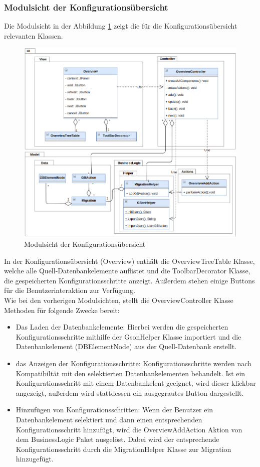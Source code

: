 \subsubsection{Modulsicht der Konfigurationsübersicht}
Die Modulsicht in der Abbildung \ref{img:modulsicht-overview} zeigt die für die Konfigurationsübersicht relevanten Klassen.
\begin{figure}[H]
	\centering
	\includegraphics[width=\textwidth]{images/sichten/modulsicht-overview}
	\caption{Modulsicht der Konfigurationsübersicht}
	\label{img:modulsicht-overview}
\end{figure}
In der Konfigurationsübersicht (Overview) enthält die OverviewTreeTable Klasse, welche alle Quell-Datenbankelemente auflistet und die ToolbarDecorator Klasse, die gespeicherten Konfigurationsschritte anzeigt. Außerdem stehen einige Buttons für die Benutzerinteraktion zur Verfügung. \\
Wie bei den vorherigen Modulsichten, stellt die OverviewController Klasse Methoden für folgende Zwecke bereit:
\begin{itemize}
	\item Das Laden der Datenbankelemente: Hierbei werden die gespeicherten Konfigurationsschritte mithilfe der GsonHelper Klasse importiert und die Datenbankelement (DBElementNode) aus der Quell-Datenbank erstellt.
	\item das Anzeigen der Konfigurationsschritte: Konfigurationsschritte werden nach Kompatibiltät mit den selektierten Datenbankelementen behandelt. Ist ein Konfigurationsschritt mit einem Datenbankelent geeignet, wird dieser klickbar angezeigt, außerdem wird stattdessen ein ausgegrautes Button dargestellt.
	\item Hinzufügen von Konfigurationsschritten: Wenn der Benutzer ein Datenbankelement selektiert und dann einen entsprechenden Konfigurationsschritt hinzufügt, wird die OverviewAddAction Aktion von dem BusinessLogic Paket ausgelöst. Dabei wird der entsprechende Konfigurationsschritt durch die MigrationHelper Klasse zur Migration hinzugefügt.
\end{itemize}



